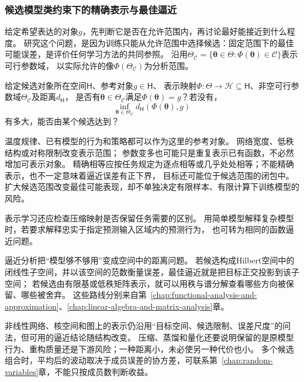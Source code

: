 \subsubsection{候选模型类约束下的精确表示与最佳逼近}
\label{sec:future-analysis-representation}

给定希望表达的对象$g$，先判断它是否在允许范围内，再讨论最好能接近到什么程度。
研究这个问题，是因为训练只能从允许范围中选择候选：固定范围下的最佳可能误差，是评价任何学习方法的共同参照。
沿用$\Theta_{\mathcal C}=\{\bm\theta\in\Theta:\Phi(\bm\theta)\in\mathcal C\}$表示可行参数域，
以实际允许的像$\Phi(\Theta_{\mathcal C})$为分析范围。

\begin{mathproblem}[目标的表示与逼近]
  \label{question:future-representation}
  给定候选对象所在空间$\mathsf H$、参考对象$g\in\mathsf H$、
  表示映射$\Phi:\Theta\to\mathcal H\subseteq\mathsf H$、非空可行参数域$\Theta_{\mathcal C}$及距离$d_{\mathsf H}$，
  是否有$\bm\theta\in\Theta_{\mathcal C}$满足$\Phi(\bm\theta)=g$？若没有，
  \[
    \inf_{\bm\theta\in\Theta_{\mathcal C}}
      d_{\mathsf H}(\Phi(\bm\theta),g)
  \]
  有多大，能否由某个候选达到？
\end{mathproblem}

温度规律、已有模型的行为和策略都可以作为这里的参考对象。
网络宽度、低秩结构或对称限制改变表示范围；
参数变多也可能只是重复表示已有函数，不必然增加可表示对象。
精确相等应按任务规定为逐点相等或几乎处处相等；不能精确表示，也不一定意味着逼近误差有正下界，
目标还可能位于候选范围的闭包中。扩大候选范围改变最佳可能表现，却不单独决定有限样本、有限计算下训练模型的风险。

表示学习还应检查压缩映射是否保留任务需要的区别。
用简单模型解释复杂模型时，若要求解释忠实于指定预测输入区域内的预测行为，
也可转为相同的函数逼近问题。

逼近分析把“模型够不够用”变成空间中的距离问题。
若候选构成Hilbert空间中的闭线性子空间，并以该空间的范数衡量误差，最佳逼近就是把目标正交投影到该子空间；
若候选由有限基或低秩矩阵表示，就可以用秩与谱分解查看哪些方向被保留、哪些被舍弃。
这些路线分别来自第~\ref{chap:functional-analysis-and-approximation}、\ref{chap:linear-algebra-and-matrix-analysis}章。

非线性网络、核空间和图上的表示仍沿用“目标空间、候选限制、误差尺度”的问法，但可用的逼近结论随结构改变。
压缩、蒸馏和量化还要说明保留的是原模型行为、重构质量还是下游风险；一种距离小，未必使另一种代价也小。
多个候选组合时，平均后的波动取决于成员误差的协方差，可联系第~\ref{chap:random-variables}章，不能只按成员数判断收益。

